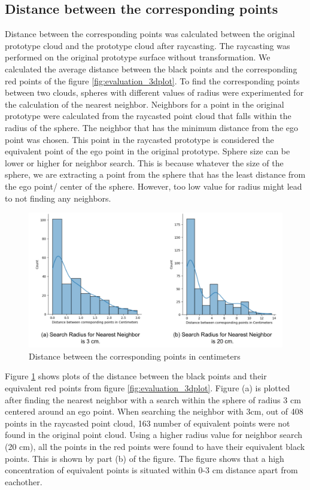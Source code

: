 \subsection{Distance between the corresponding points}
Distance between the corresponding points was calculated between the original prototype cloud and the prototype cloud after raycasting. The raycasting was performed on the original prototype surface without transformation. We calculated the average distance between the black points and the corresponding red points of the figure \ref{fig:evaluation_3dplot}. To find the corresponding points between two clouds, spheres with different values of radius were experimented for the calculation of the nearest neighbor. Neighbors for a point in the original prototype were calculated from the raycasted point cloud that falls within the radius of the sphere. The neighbor that has the minimum distance from the ego point was chosen. This point in the raycasted prototype is considered the equivalent point of the ego point in the original prototype. Sphere size can be lower or higher for neighbor search. This is because whatever the size of the sphere, we are extracting a point from the sphere that has the least distance from the ego point/ center of the sphere. However, too low value for radius might lead to not finding any neighbors.
\begin{figure}[htbp]
    \centering
    \includegraphics[width=1\linewidth]{97_graphics/evaluation/distn_betn_corresponding_points_in_raycasting.pdf}
    \caption{Distance between the corresponding points in centimeters}
    \label{fig:evaluation_distn_corresponding_points}
\end{figure}
Figure \ref{fig:evaluation_distn_corresponding_points} shows plots of the distance between the black points and their equivalent red points from figure \ref{fig:evaluation_3dplot}. Figure (a) is plotted after finding the nearest neighbor with a search within the sphere of radius 3 cm centered around an ego point. When searching the neighbor with 3cm, out of 408 points in the raycasted point cloud, 163 number of equivalent points were not found in the original point cloud. Using a higher radius value for neighbor search (20 cm), all the points in the red points were found to have their equivalent black points. This is shown by part (b) of the figure. The figure shows that a high concentration of equivalent points is situated within 0-3 cm distance apart from eachother.

